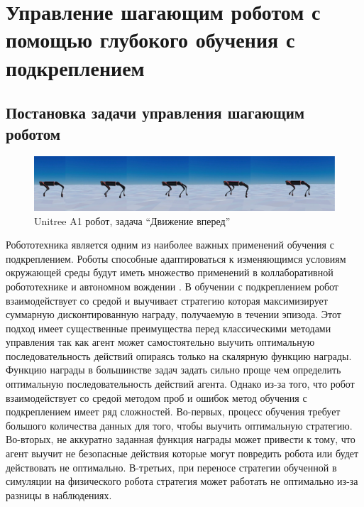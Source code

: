 \chapter{Управление шагающим роботом с помощью глубокого обучения с подкреплением}\label{ch:ch3}

\section{Постановка задачи управления шагающим роботом}


\begin{figure}[ht]
    \includegraphics[width=1\textwidth]{images/move_forward.png}
    \caption{Unitree A1 робот, задача ``Движение вперед''}
    \label{fig:mv_forward}
\end{figure}


Робототехника является одним из наиболее важных применений обучения с подкреплением. Роботы способные адаптироваться к изменяющимся условиям окружающей среды будут иметь множество применений в коллаборативной робототехнике \cite{levine2016end} и автономном вождении \cite{kiran2021deep}. В обучении с подкреплением робот взаимодействует со средой и выучивает стратегию которая максимизирует суммарную дисконтированную награду, получаемую в течении эпизода.  Этот подход имеет существенные преимущества перед классическими методами управления так как агент может самостоятельно выучить оптимальную последовательность действий опираясь только на скалярную функцию награды. Функцию награды в большинстве задач задать сильно проще чем определить оптимальную последовательность действий агента. Однако из-за того, что робот взаимодействует со средой методом проб и ошибок метод обучения с подкреплением имеет ряд сложностей. Во-первых, процесс обучения требует большого количества данных для того, чтобы выучить оптимальную стратегию. Во-вторых, не аккуратно заданная функция награды может привести к тому, что агент выучит не безопасные действия которые могут повредить робота или будет действовать не оптимально. В-третьих, при переносе стратегии обученной в симуляции на физического робота стратегия может работать не оптимально из-за разницы в наблюдениях. 

